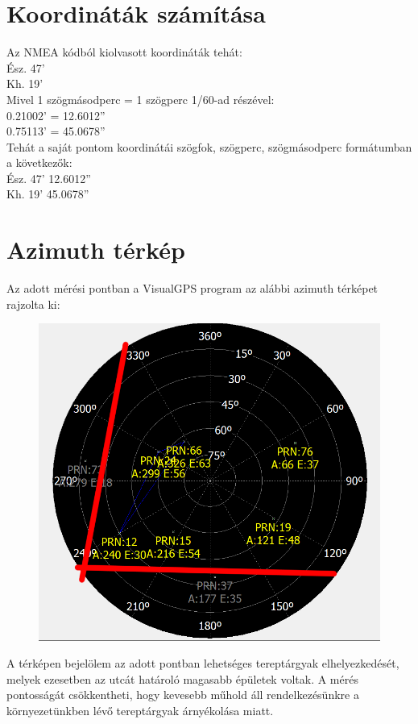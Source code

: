 \documentclass[10pt, conference,a4paper]{ITKproc}
\begin{document}
\section{Koordináták számítása}
Az NMEA kódból kiolvasott koordináták tehát: \\
Ész. 47' \\
Kh. 19' \\
Mivel 1 szögmásodperc = 1 szögperc 1/60-ad részével: \\
0.21002' =  12.6012''\\
0.75113' =  45.0678''\\
Tehát a saját pontom koordinátái szögfok, szögperc, szögmásodperc formátumban a következők: \\
Ész. 47' 12.6012'' \\
Kh. 19' 45.0678'' \\
\section{Azimuth térkép}
Az adott mérési pontban a VisualGPS program az alábbi azimuth térképet rajzolta ki:

\begin{figure}[h]
\includegraphics[scale=0.3]{azimuth_sajat_r}
\centering
\end{figure}
A térképen bejelölem az adott pontban lehetséges tereptárgyak elhelyezkedését, melyek ezesetben az utcát határoló magasabb épületek voltak. A mérés pontosságát csökkentheti, hogy kevesebb műhold áll rendelkezésünkre a környezetünkben lévő tereptárgyak árnyékolása miatt. 
\end{document}
